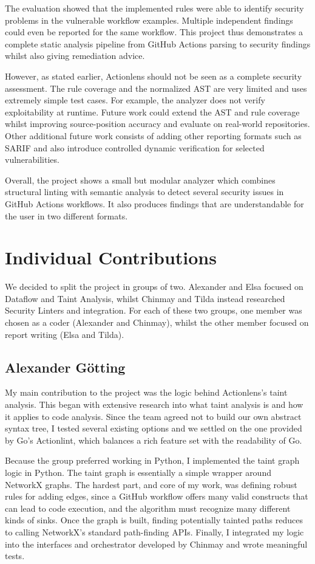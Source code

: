 \documentclass{article}
\begin{document}
The evaluation showed that the implemented rules were able to identify security problems in the vulnerable workflow examples. Multiple independent findings could even be reported for the same workflow. This project thus demonstrates a complete static analysis pipeline from GitHub Actions parsing to security findings whilst also giving remediation advice. 

However, as stated earlier, Actionlens should not be seen as a complete security assessment. The rule coverage and the normalized AST are very limited and uses extremely simple test cases. For example, the analyzer does not verify exploitability at runtime. Future work could extend the AST and rule coverage whilst improving source-position accuracy and evaluate on real-world repositories. Other additional future work consists of adding other reporting formats such as SARIF and also introduce controlled dynamic verification for selected vulnerabilities.

Overall, the project shows a small but modular analyzer which combines structural linting with semantic analysis to detect several security issues in GitHub Actions workflows. It also produces findings that are understandable for the user in two different formats. 

\section{Individual Contributions}

We decided to split the project in groups of two. Alexander and Elsa focused on Dataflow and Taint Analysis, whilst Chinmay and Tilda instead researched Security Linters and integration. For each of these two groups, one member was chosen as a coder (Alexander and Chinmay), whilst the other member focused on report writing (Elsa and Tilda). 

\subsection{Alexander Götting}
My main contribution to the project was the logic behind Actionlens’s taint analysis. This began with extensive research into what taint analysis is and how it applies to code analysis. Since the team agreed not to build our own abstract syntax tree, I tested several existing options and we settled on the one provided by Go’s Actionlint, which balances a rich feature set with the readability of Go.

Because the group preferred working in Python, I implemented the taint graph logic in Python. The taint graph is essentially a simple wrapper around NetworkX graphs. The hardest part, and core of my work, was defining robust rules for adding edges, since a GitHub workflow offers many valid constructs that can lead to code execution, and the algorithm must recognize many different kinds of sinks. Once the graph is built, finding potentially tainted paths reduces to calling NetworkX’s standard path-finding APIs. Finally, I integrated my logic into the interfaces and orchestrator developed by Chinmay and wrote meaningful tests.
\end{document}
